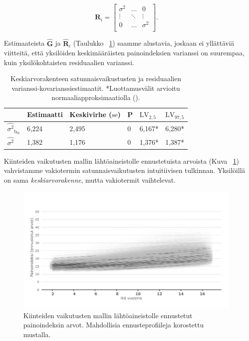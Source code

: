 \documentclass[finnish]{docopts}
\begin{document}
$$
\bm{R}_i =
\begin{bmatrix}
\sigma^2 & \dots & 0 \\
\vdots & \ddots & \vdots \\
0 & \dots & \sigma^2 \\
\end{bmatrix}.
$$

Estimaateista $\hat{\bm{G}}$ ja $\hat{\bm{R}}_i$ (Taulukko ~\ref{table:lme1}) saamme alustavia, joskaan ei yllättäviä viitteitä, että yksilöiden keskimääräisten painoindeksien varianssi on suurempaa, kuin yksilökohtaisten residuaalien varianssi.\\

\begin{table}[H]
\centering
\begin{tabular}{llllll}
\toprule
  & Estimaatti & Keskivirhe ($\text{se}$) & P & $\text{LV}_{2,5}$ & $\text{LV}_{97,5}$\\
\midrule
$\hat{\sigma^2}_{\text{b}_{0i}}$ & 6,224 & 2,495 & 0 & 6,167* & 6,280*\\
\addlinespace
$\hat{\sigma^2}$ & 1,382 & 1,176 & 0 & 1,376* & 1,387*\\
\bottomrule
\end{tabular}
\caption{Keskiarvorakenteen satunnaisvaikustusten ja residuaalien varianssi-kovarianssiestimaatit. *Luottamusvälit arvioitu normaaliapproksimaatiolla (\cite{pinheiro00}).}
\label{table:lme1}
\end{table}

Kiinteiden vaikutusten mallin lähtöaineistolle ennustetuista arvoista (Kuva ~\ref{fig:lme1_bmi_pred}) vahvistamme vakiotermin satunnaisvaikutusten intuitiivisen tulkinnan. Yksilöillä on sama \textit{keskiarvorakenne}, mutta vakiotermit vaihtelevat.\\

\begin{figure}[H]
\centering
  \includegraphics[scale=0.8]{kuvaajat/lme_bmi_ennuste.png}
  \caption{Kiinteiden vaikutusten mallin lähtöaineistolle ennustetut painoindeksin arvot. Mahdollisia ennusteprofiileja korostettu mustalla.}
  \label{fig:lme1_bmi_pred}
\end{figure}
\end{document}

